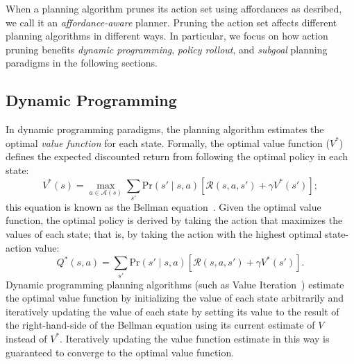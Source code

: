 \documentclass[]{article}
\begin{document}

When a planning algorithm prunes its action set using affordances as 
desribed, we call it an {\it affordance-aware} planner.
Pruning the action set affects
different planning algorithms in different ways. In particular, we
focus on how action pruning benefits {\em dynamic programming}, {\em
  policy rollout}, and {\em subgoal} planning paradigms in the
following sections.

\subsection{Dynamic Programming}
In dynamic programming paradigms, the planning algorithm estimates the
optimal {\em value function} for each state. Formally, the optimal
value function ($V^*$) defines the expected discounted return from
following the optimal policy in each state:
\begin{equation}
\label{eq:bellman}
V^*(s) = \max_{a \in \mathcal{A}(s)} \sum_{s'} \text{Pr}(s' \mid s, a)\left[\mathcal{R}(s,a,s') + \gamma V^*(s') \right];
\end{equation}
this equation is known as the Bellman
equation~\citep{bellman57}. Given the optimal value function, the
optimal policy is derived by taking the action that maximizes the
values of each state; that is, by taking the action with the
highest optimal state-action value:
\begin{equation}
\label{eq:qvalue}
Q^*(s,a) = \sum_{s'} \text{Pr}(s' \mid s, a)\left[\mathcal{R}(s,a,s') + \gamma V^*(s') \right].
\end{equation}
Dynamic programming planning algorithms (such as Value
Iteration~\citep{bellman57}) estimate the optimal value function by
initializing the value of each state arbitrarily and iteratively
updating the value of each state by setting its value to the result of
the right-hand-side of the Bellman equation using its current estimate
of $V$ instead of $V^*$. Iteratively updating the value function
estimate in this way is guaranteed to converge to the optimal value
function.
\end{document}
